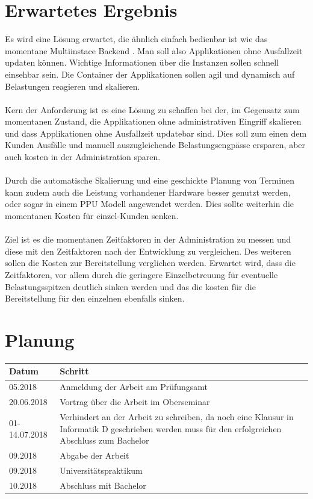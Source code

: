 \documentclass[a4paper]{article}
\begin{document}
\section{Erwartetes Ergebnis}
Es wird eine Lösung erwartet, die ähnlich einfach bedienbar ist wie das 
momentane Multiinstace Backend \cite{osmib}. Man soll also Applikationen ohne 
Ausfallzeit updaten können. Wichtige Informationen über die Instanzen sollen 
schnell einsehbar sein. Die Container der Applikationen sollen agil und 
dynamisch auf Belastungen reagieren und skalieren.\\
\\
Kern der Anforderung ist es eine Lösung zu schaffen bei der, im Gegensatz zum 
momentanen Zustand, die Applikationen ohne administrativen Eingriff skalieren 
und dass Applikationen ohne Ausfallzeit updatebar sind. Dies soll zum einen dem 
Kunden Ausfälle und manuell auszugleichende Belastungsengpässe ersparen, aber 
auch kosten in der Administration sparen.\\
\\
Durch die automatische Skalierung und eine geschickte Planung von Terminen kann 
zudem auch die Leistung vorhandener Hardware besser genutzt werden, oder sogar 
in einem \ac{PPU} Modell angewendet werden. Dies sollte weiterhin die 
momentanen Kosten für einzel-Kunden senken.\\
\\
Ziel ist es die momentanen Zeitfaktoren in der Administration zu messen und 
diese mit den Zeitfaktoren nach der Entwicklung zu vergleichen. Des weiteren 
sollen die Kosten zur Bereitstellung verglichen werden. Erwartet wird, dass die 
Zeitfaktoren, vor allem durch die geringere Einzelbetreuung für eventuelle 
Belastungsspitzen deutlich sinken werden und das die kosten für die 
Bereitstellung für den einzelnen ebenfalls sinken.
\section{Planung}
\begin{tabular}{l|p{13cm}}
	\textbf{Datum} & \textbf{Schritt} \\ \hline
	05.2018 & Anmeldung der Arbeit am Prüfungsamt \\
	20.06.2018 & Vortrag über die Arbeit im Oberseminar \\
	01-14.07.2018 & Verhindert an der Arbeit zu schreiben, da noch eine Klausur 
	in Informatik D geschrieben werden muss für den erfolgreichen Abschluss zum 
	Bachelor \\
	09.2018 & Abgabe der Arbeit\\
	09.2018 & Universitätspraktikum \\
	10.2018 & Abschluss mit Bachelor
\end{tabular}
\newpage
\end{document}
